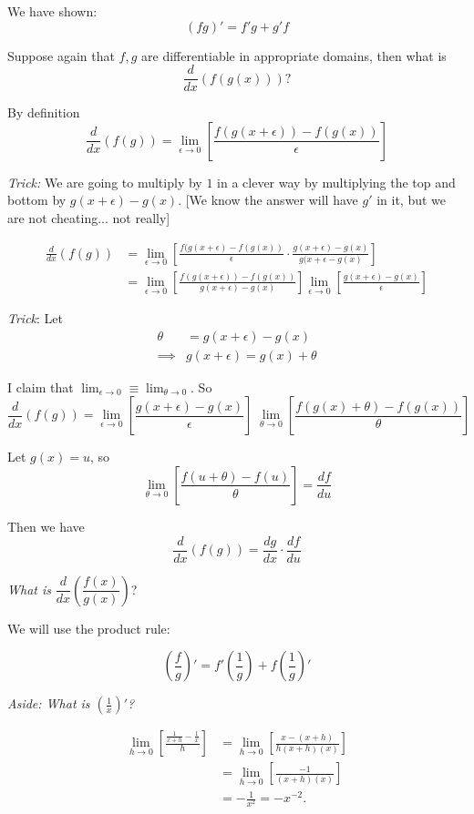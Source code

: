 \documentclass[twoside]{scrartcl}
\begin{document}
We have shown:
\[\boxed{(fg)' = f'g + g'f}\]



Suppose again that $f,g$ are differentiable in appropriate domains, then what is
\[\frac{d}{dx}(f(g(x)))?\]

By definition
\[\frac{d}{dx}(f(g)) = \lim_{\epsilon \to 0} \left[\frac{f(g(x+\epsilon)) - f(g(x))}{\epsilon}\right]\]

\emph{Trick:} We are going to multiply by $1$ in a clever way by multiplying the top and bottom by $g(x+\epsilon) - g(x)$. [We know the answer will have $g'$ in it, but we are not cheating... not really] 

\[
\begin{aligned}
  \frac{d}{dx}(f(g)) &= \lim_{\epsilon \to 0}\left[\frac{f(g(x+\epsilon) - f(g(x))}{\epsilon}\cdot \frac{g(x+\epsilon)-g(x)}{g(x+\epsilon -g(x)}\right]\\[0.2cm]
  &= \lim_{\epsilon \to 0} \left[\frac{f(g(x+\epsilon))-f(g(x))}{g(x+\epsilon)-g(x)}\right]\lim_{\epsilon \to 0}\left[\frac{g(x+\epsilon)-g(x)}{\epsilon}\right]
\end{aligned}
\]\vspace*{10pt}

\emph{Trick}: Let 
\[
\begin{aligned}
  \theta &= g(x+ \epsilon) -g(x)\\
  \implies &g(x+\epsilon) = g(x) + \theta 
\end{aligned}
\]

I claim that $\lim_{\epsilon \to 0}\equiv \lim_{\theta \to 0}$. So
\[\frac{d}{dx}(f(g)) = \lim_{\epsilon \to 0}\left[\frac{g(x+\epsilon)-g(x)}{\epsilon}\right]\;\lim_{\theta \to 0}\left[\frac{f(g(x) + \theta) -f(g(x))}{\theta}\right]\]

Let $g(x) = u$, so 
\[\lim_{\theta \to 0} \left[\frac{f(u + \theta) - f(u)}{\theta}\right] = \frac{df}{du}\]

Then we have 
\[\boxed{\frac{d}{dx}(f(g)) = \frac{dg}{dx}\cdot \frac{df}{du}}\]



\emph{What is} $\dfrac{d}{dx}\left(\dfrac{f(x)}{g(x)}\right)$? 

We will use the product rule: 

\[\left(\frac{f}{g}\right)' = f'\left(\frac{1}{g}\right) + f\left(\frac{1}{g}\right)'\]

\emph{Aside: What is $\left(\frac{1}{x}\right)'$?}

\[
\begin{aligned}
  \lim_{h \to 0}\left[\frac{\frac{1}{x+h} - \frac{1}{x}}{h}\right] &= \lim_{h \to 0}\left[\frac{x - (x+h)}{h(x+h)(x)}\right]\\
  &= \lim_{h \to 0}\left[\frac{-1}{(x+h)(x)}\right]\\
  &= -\frac{1}{x^2} = -x^{-2}. 
\end{aligned}
\]
\end{document}
